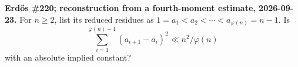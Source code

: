 \textbf{Erd\H{o}s \#220; reconstruction from a fourth-moment estimate, 2026-09-23.}
For $n\geq2$, list its reduced residues as $1=a_1<a_2<\cdots<a_{\varphi(n)}=n-1$. Is
\[
\sum_{i=1}^{\varphi(n)-1}(a_{i+1}-a_i)^2\ll n^2/\varphi(n)
\]
with an absolute implied constant?
